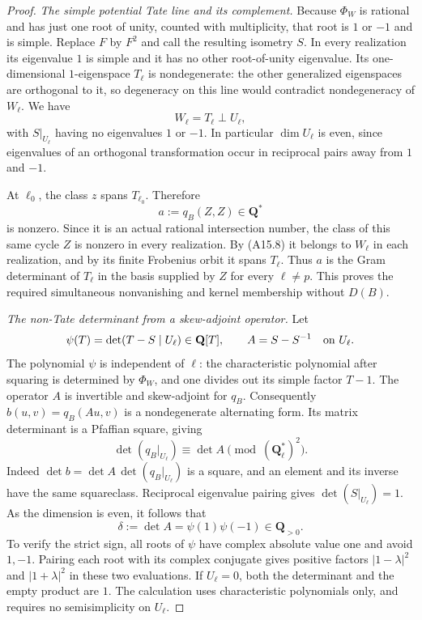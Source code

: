 \documentclass[11pt]{article}
\theoremstyle{remark}\newtheorem{remark}[theorem]{Remark}
\begin{document}
\begin{proof}
\emph{The simple potential Tate line and its complement.}
Because $\Phi_W$ is rational and has just one root of unity,
counted with multiplicity, that root is $1$ or $-1$ and is
simple. Replace $F$ by $F^2$ and call the resulting isometry
$S$. In every realization its eigenvalue $1$ is simple and
it has no other root-of-unity eigenvalue. Its one-dimensional
$1$-eigenspace $T_\ell$ is nondegenerate: the other generalized
eigenspaces are orthogonal to it, so degeneracy on this line
would contradict nondegeneracy of $W_\ell$. We have
\[
              W_\ell=T_\ell\perp U_\ell,
 \tag{A15.9}
\]
with $S|_{U_\ell}$ having no eigenvalues $1$ or $-1$.
In particular $\dim U_\ell$ is even, since eigenvalues of an
orthogonal transformation occur in reciprocal pairs away
from $1$ and $-1$.

At $\ell_0$, the class $z$ spans $T_{\ell_0}$. Therefore
\[
                           a:=q_B(Z,Z)\in\mathbf Q^*
 \tag{A15.10}
\]
is nonzero. Since it is an actual rational intersection number,
the class of this same cycle $Z$ is nonzero in every realization.
By (A15.8) it belongs to $W_\ell$ in each realization, and by
its finite Frobenius orbit it spans $T_\ell$. Thus $a$ is the
Gram determinant of $T_\ell$ in the basis supplied by $Z$
for every $\ell\ne p$. This proves the required simultaneous
nonvanishing and kernel membership without $D(B)$.

\emph{The non-Tate determinant from a skew-adjoint operator.}
Let
\[
  \psi(T)=\det(T-S\mid U_\ell)\in\mathbf Q[T],\qquad
  A=S-S^{-1}\quad\hbox{on }U_\ell.
\]
The polynomial $\psi$ is independent of $\ell$: the
characteristic polynomial after squaring is determined by
$\Phi_W$, and one divides out its simple factor $T-1$.
The operator $A$ is invertible and skew-adjoint for $q_B$.
Consequently $b(u,v)=q_B(Au,v)$ is a nondegenerate alternating
form. Its matrix determinant is a Pfaffian square, giving
\[
                   \det(q_B|_{U_\ell})\equiv\det A
                      \pmod{(\mathbf Q_\ell^*)^2}.
 \tag{A15.11}
\]
Indeed $\det b=\det A\,\det(q_B|_{U_\ell})$ is a square,
and an element and its inverse have the same squareclass.
Reciprocal eigenvalue pairing gives $\det(S|_{U_\ell})=1$.
As the dimension is even, it follows that
\[
       \delta:=\det A=\psi(1)\psi(-1)\in\mathbf Q_{>0}.
 \tag{A15.12}
\]
To verify the strict sign, all roots of $\psi$ have complex
absolute value one and avoid $1,-1$. Pairing each root with
its complex conjugate gives positive factors
$|1-\lambda|^2$ and $|1+\lambda|^2$ in these two evaluations.
If $U_\ell=0$, both the determinant and the empty product
are $1$. The calculation uses characteristic polynomials
only, and requires no semisimplicity on $U_\ell$.


\end{proof}
\end{document}
